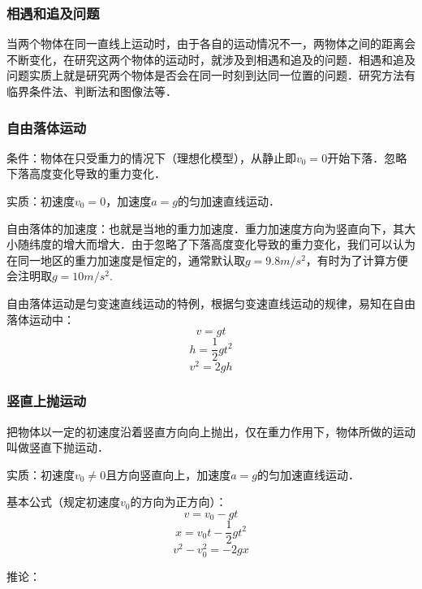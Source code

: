 \subsubsection{相遇和追及问题}
当两个物体在同一直线上运动时，由于各自的运动情况不一，两物体之间的距离会不断变化，在研究这两个物体的运动时，就涉及到相遇和追及的问题．相遇和追及问题实质上就是研究两个物体是否会在同一时刻到达同一位置的问题．研究方法有临界条件法、判断法和图像法等．

\subsubsection{自由落体运动}
条件：物体在只受重力的情况下（理想化模型），从静止即$v_0=0$开始下落．忽略下落高度变化导致的重力变化．

实质：初速度$v_0=0$，加速度$a=g$的匀加速直线运动．

自由落体的加速度：也就是当地的重力加速度．重力加速度方向为竖直向下，其大小随纬度的增大而增大．由于忽略了下落高度变化导致的重力变化，我们可以认为在同一地区的重力加速度是恒定的，通常默认取$g=9.8m/s^2$，有时为了计算方便会注明取$g=10m/s^2$.

自由落体运动是匀变速直线运动的特例，根据匀变速直线运动的规律，易知在自由落体运动中：
\begin{equation}
v=gt
\end{equation}
\begin{equation}
h=\frac12gt^2
\end{equation}
\begin{equation}
v^2=2gh
\end{equation}

\subsubsection{竖直上抛运动}
把物体以一定的初速度沿着竖直方向向上抛出，仅在重力作用下，物体所做的运动叫做竖直下抛运动．

实质：初速度$v_0\neq0$且方向竖直向上，加速度$a=g$的匀加速直线运动．

基本公式（规定初速度$v_0$的方向为正方向）：
\begin{equation}
v=v_0-gt
\end{equation}
\begin{equation}
x=v_0t-\frac12gt^2
\end{equation}
\begin{equation}
v^2-v_0^2=-2gx
\end{equation}

推论：

